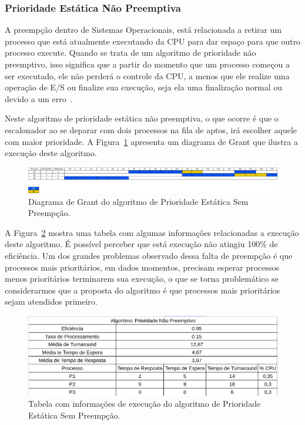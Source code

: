 \documentclass[
	12pt,				%
	oneside,   	        %
	a4paper,			%
	english,			%
	french,				%
	spanish,			%
	brazil,				%
	]{pacotes/abntex2}
\begin{document}
\subsubsection{Prioridade Estática Não Preemptiva}
\label{subsubsec:prio_sem_preemp}

A preempção dentro de Sistemas Operacionais, está relacionada a retirar um processo que está atualmente executando da CPU para dar espaço para que outro processo execute. Quando se trata de um algoritmo de prioridade não preemptivo, isso significa que a partir do momento que um processo começou a ser executado, ele não perderá o controle da CPU, a menos que ele realize uma operação de E/S ou finalize sua execução, seja ela uma finalização normal ou devido a um erro~\cite{maziero2019}.

Neste algoritmo de prioridade estática não preemptiva, o que ocorre é que o escalonador ao se deparar com dois processos na fila de aptos, irá escolher aquele com maior prioridade. A Figura~\ref{fig:prio_sem_preemp} apresenta um diagrama de Grant que ilustra a execução deste algoritmo.

\begin{figure}[H]
  \centering
  \includegraphics[scale=0.20]{figuras/ex2/prio_sem_preemp.png}
  \caption{Diagrama de Grant do algoritmo de Prioridade Estática Sem Preempção.}
  \label{fig:prio_sem_preemp}
\end{figure}

A Figura~\ref{fig:table_prio_sem_preemp} mostra uma tabela com algumas informações relacionadas a execução deste algoritmo. É possível perceber que está execução não atingiu 100\% de eficiência. Um dos grandes problemas observado dessa falta de preempção é que processos mais prioritários, em dados momentos, precisam esperar processos menos prioritários terminarem sua execução, o que se torna problemático se considerarmos que a proposta do algoritmo é que processos mais prioritários sejam atendidos primeiro.

\begin{figure}[H]
  \centering
  \includegraphics[scale=0.5]{figuras/ex2/table_prio_sem_preemp.png}
  \caption{Tabela com informações de execução do algoritmo de Prioridade Estática Sem Preempção.}
  \label{fig:table_prio_sem_preemp}
\end{figure}
\end{document}
